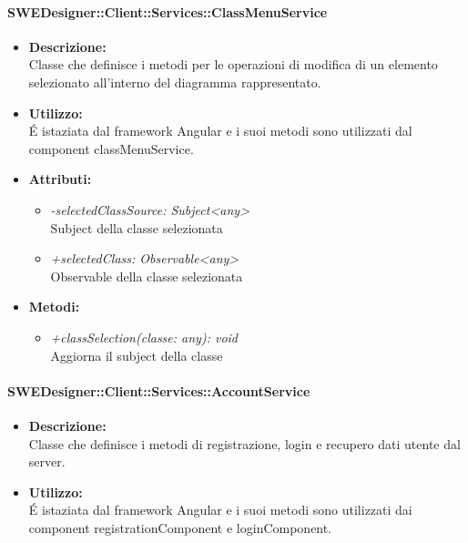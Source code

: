           	\paragraph{SWEDesigner::Client::Services::ClassMenuService}
				\begin{itemize}
          			\item \textbf{Descrizione:}\\
          			Classe che definisce i metodi per le operazioni di modifica di un elemento selezionato all’interno del diagramma rappresentato.
          			\item \textbf{Utilizzo:}\\
          			É istaziata dal framework Angular e i suoi metodi sono utilizzati dal component classMenuService.
          			\item \textbf{Attributi:}\\
          			\begin{itemize}
          				\item \emph{-selectedClassSource: Subject<any>}\\
            			Subject della classe selezionata
            			\item \emph{+selectedClass: Observable<any>}\\
            			Observable della classe selezionata
          			\end{itemize}
          			\item \textbf{Metodi:}\\
          			\begin{itemize}
          				\item \emph{+classSelection(classe: any): void}\\
            			Aggiorna il subject della classe
          			\end{itemize}
          		\end{itemize}
          	\paragraph{SWEDesigner::Client::Services::AccountService}
				\begin{itemize}
          			\item \textbf{Descrizione:}\\
          			Classe che definisce i metodi di registrazione, login e recupero dati utente dal server.
          			\item \textbf{Utilizzo:}\\
          			É istaziata dal framework Angular e i suoi metodi sono utilizzati dai component registrationComponent e loginComponent.
          		\end{itemize}
